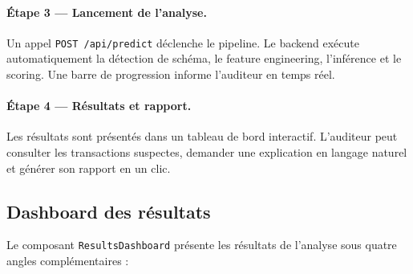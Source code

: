 \documentclass[12pt,a4paper,twoside]{report}
\begin{document}
\paragraph{Étape 3 --- Lancement de l'analyse.} Un appel \texttt{POST /api/predict} déclenche le pipeline. Le backend exécute automatiquement la détection de schéma, le feature engineering, l'inférence et le scoring. Une barre de progression informe l'auditeur en temps réel.

\paragraph{Étape 4 --- Résultats et rapport.} Les résultats sont présentés dans un tableau de bord interactif. L'auditeur peut consulter les transactions suspectes, demander une explication en langage naturel et générer son rapport en un clic.

\subsection{Dashboard des résultats}

Le composant \texttt{ResultsDashboard} présente les résultats de l'analyse sous quatre angles complémentaires :
\end{document}
